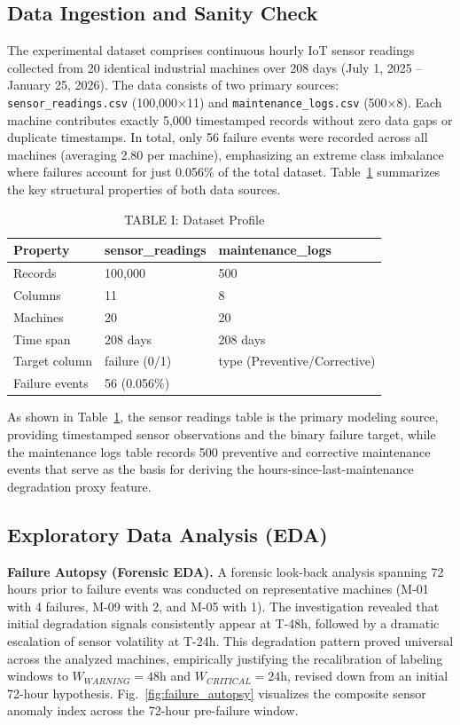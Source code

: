 \documentclass[conference]{IEEEtran}
\begin{document}
\subsection{Data Ingestion and Sanity Check}
The experimental dataset comprises continuous hourly IoT sensor readings collected from 20 identical industrial machines over 208 days (July 1, 2025 – January 25, 2026). The data consists of two primary sources: \texttt{sensor\_readings.csv} (100,000$\times$11) and \texttt{maintenance\_logs.csv} (500$\times$8). Each machine contributes exactly 5,000 timestamped records without zero data gaps or duplicate timestamps. In total, only 56 failure events were recorded across all machines (averaging 2.80 per machine), emphasizing an extreme class imbalance where failures account for just 0.056\% of the total dataset. Table~\ref{tab:dataset_profile} summarizes the key structural properties of both data sources.

\begin{table}[htbp]
\caption{TABLE I: Dataset Profile}
\centering
\begin{tabular}{lll}
\hline
\textbf{Property} & \textbf{sensor\_readings} & \textbf{maintenance\_logs} \\
\hline
Records & 100,000 & 500 \\
Columns & 11 & 8 \\
Machines & 20 & 20 \\
Time span & 208 days & 208 days \\
Target column & failure (0/1) & type (Preventive/Corrective) \\
Failure events & 56 (0.056\%) &   \\
\hline
\end{tabular}
\label{tab:dataset_profile}
\end{table}

As shown in Table~\ref{tab:dataset_profile}, the sensor readings table is the primary modeling source, providing timestamped sensor observations and the binary failure target, while the maintenance logs table records 500 preventive and corrective maintenance events that serve as the basis for deriving the hours-since-last-maintenance degradation proxy feature.

\subsection{Exploratory Data Analysis (EDA)}

\textbf{Failure Autopsy (Forensic EDA).} A forensic look-back analysis spanning 72 hours prior to failure events was conducted on representative machines (M-01 with 4 failures, M-09 with 2, and M-05 with 1). The investigation revealed that initial degradation signals consistently appear at T-48h, followed by a dramatic escalation of sensor volatility at T-24h. This degradation pattern proved universal across the analyzed machines, empirically justifying the recalibration of labeling windows to $W_{WARNING}=48$h and $W_{CRITICAL}=24$h, revised down from an initial 72-hour hypothesis. Fig.~\ref{fig:failure_autopsy} visualizes the composite sensor anomaly index across the 72-hour pre-failure window.
\end{document}

